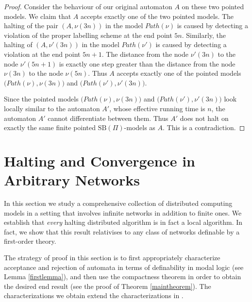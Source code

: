 \documentclass[copyright,creativecommons]{eptcs}
\begin{document}
\begin{proof}
Consider the behaviour of our original automaton $A$ on these two
pointed models. We claim that $A$ accepts
exactly one of the two pointed models.
The halting of the pair $(A,\nu(3n))$ in the model ${Path}(\nu)$
is caused by detecting a violation of the proper labelling 
scheme  at the end point $5n$.
Similarly, the halting of $(A,\nu'(3n))$ in the model ${Path}(\nu')$
is caused by detecting a violation
at the end point $5n + 1$.
The distance from the node $\nu'(3n)$ to the node $\nu'(5n+1)$ is
exactly one step greater than
the distance from the node $\nu(3n)$ to the node $\nu(5n)$.
Thus $A$ accepts exactly one of the pointed models
$\bigl(\mathit{Path}(\nu),\nu(3n)\bigl)$
and $\bigl(\mathit{Path}(\nu'),\nu'(3n)\bigl)$.




Since the pointed models $\bigl(\mathit{Path}(\nu),\nu(3n)\bigl)$
and $\bigl(\mathit{Path}(\nu'),\nu'(3n)\bigl)$ look locally similar
to the automaton $A'$, whose effective running time is $n$,
the automaton $A'$ cannot differentiate between them.
Thus $A'$ does not halt on exactly the same finite
pointed $\mathrm{SB}(\Pi)$-models as $A$.
This is a contradiction.
\end{proof}




\section{Halting and Convergence in Arbitrary Networks}\label{arbitrary}




In this section we study a 
comprehensive collection of distributed computing models in a setting
that involves infinite networks in addition to finite ones.
We establish that \emph{every} halting distributed algorithm is in fact a local algorithm.
In fact, we show that this result relativises to any class of networks definable by a first-order theory.




The strategy of proof in this section is to first appropriately characterize acceptance and rejection
of automata in terms of definability in modal logic (see Lemma \ref{firstlemma}), and then use the compactness theorem
in order to obtain the desired end result
(see the proof of Theorem \ref{maintheorem}).
The characterizations we obtain extend the
characterizations in \cite{kuusi}.
\end{document}
